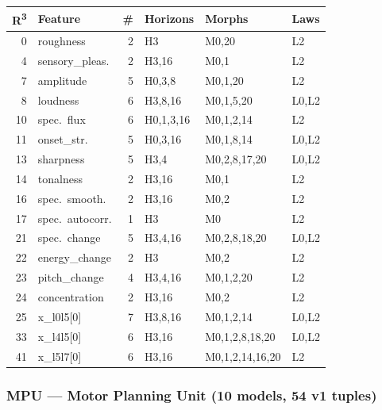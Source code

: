 {\footnotesize
\begin{longtable}{@{}r l r l l l@{}}
\toprule
\textbf{R\textsuperscript{3}} & \textbf{Feature} & \textbf{\#}
  & \textbf{Horizons} & \textbf{Morphs} & \textbf{Laws} \\
\midrule
\endfirsthead
\midrule
\endhead
\endfoot
\bottomrule
\endlastfoot

\rowcolor{grpA}
0 & roughness & 2 & H3 & M0,20 & L2 \\
\rowcolor{grpA}
4 & sensory\_pleas. & 2 & H3,16 & M0,1 & L2 \\
\rowcolor{grpB}
7 & amplitude & 5 & H0,3,8 & M0,1,20 & L2 \\
\rowcolor{grpB}
8 & loudness & 6 & H3,8,16 & M0,1,5,20 & L0,L2 \\
\rowcolor{grpB}
10 & spec.~flux & 6 & H0,1,3,16 & M0,1,2,14 & L2 \\
\rowcolor{grpB}
11 & onset\_str. & 5 & H0,3,16 & M0,1,8,14 & L0,L2 \\
\rowcolor{grpC}
13 & sharpness & 5 & H3,4 & M0,2,8,17,20 & L0,L2 \\
\rowcolor{grpC}
14 & tonalness & 2 & H3,16 & M0,1 & L2 \\
\rowcolor{grpC}
16 & spec.~smooth. & 2 & H3,16 & M0,2 & L2 \\
\rowcolor{grpC}
17 & spec.~autocorr. & 1 & H3 & M0 & L2 \\
\rowcolor{grpD}
21 & spec.~change & 5 & H3,4,16 & M0,2,8,18,20 & L0,L2 \\
\rowcolor{grpD}
22 & energy\_change & 2 & H3 & M0,2 & L2 \\
\rowcolor{grpD}
23 & pitch\_change & 4 & H3,4,16 & M0,1,2,20 & L2 \\
\rowcolor{grpD}
24 & concentration & 2 & H3,16 & M0,2 & L2 \\
\rowcolor{grpE}
25 & x\_l0l5[0] & 7 & H3,8,16 & M0,1,2,14 & L0,L2 \\
\rowcolor{grpE}
33 & x\_l4l5[0] & 6 & H3,16 & M0,1,2,8,18,20 & L0,L2 \\
\rowcolor{grpE}
41 & x\_l5l7[0] & 6 & H3,16 & M0,1,2,14,16,20 & L2 \\
\end{longtable}
}


\subsubsection*{MPU --- Motor Planning Unit (10 models, 54 v1 tuples)}


